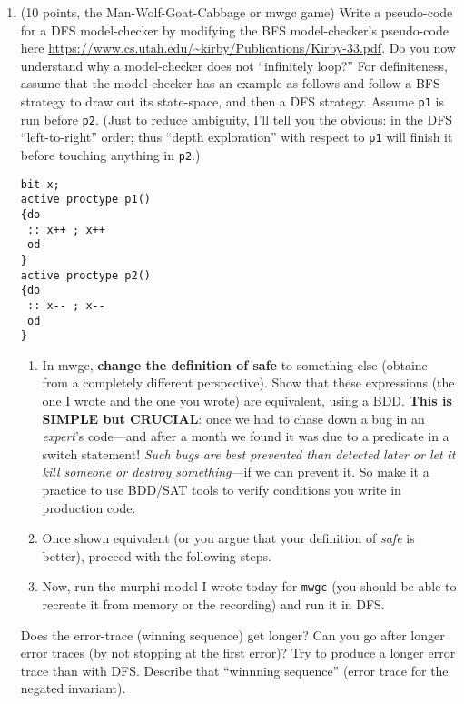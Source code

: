\documentclass[11pt]{article}
\begin{document}
\begin{enumerate}
\clearpage
\item (10 points, the Man-Wolf-Goat-Cabbage or mwgc game)
  Write a pseudo-code for
  a DFS model-checker by modifying the BFS model-checker's
  pseudo-code here
  \url{https://www.cs.utah.edu/~kirby/Publications/Kirby-33.pdf}.
  Do you now understand why a model-checker does not ``infinitely loop?''
  For definiteness, assume that the model-checker has an example as follows
  and follow a BFS strategy to draw out its state-space, and then a DFS
  strategy.
  Assume {\tt p1} is run before {\tt p2}. (Just to
  reduce ambiguity, I'll tell you
  the obvious: in the DFS ``left-to-right'' order;
  thus ``depth exploration'' with respect to {\tt p1} will finish it before
  touching anything in {\tt p2}.)
  \begin{footnotesize}
  \begin{verbatim}    
bit x;
active proctype p1()
{do
 :: x++ ; x++ 
 od
}
active proctype p2()
{do
 :: x-- ; x-- 
 od
}
\end{verbatim}
  \end{footnotesize}    
  \begin{enumerate}
\item In mwgc, {\bf change the definition of safe} to something
  else (obtaine from a completely different perspective).
  Show that these expressions (the one I wrote and the
  one you wrote) are equivalent, using a BDD.
  {\bf This is SIMPLE but CRUCIAL}: once we had to chase down
  a bug in an {\em expert}'s code---and after a month we found
  it was due to a predicate in a switch statement!
  {\em Such bugs are best prevented than detected later or let
    it kill someone or destroy something}---if we can prevent it.
  So make it a practice to use BDD/SAT tools to verify conditions
  you write in production code.
\item[]   Once shown equivalent (or you argue that your definition of {\em safe}
  is better), proceed with the following steps.
  

\item  Now, run the murphi model I wrote today
  for {\tt mwgc}
  (you should be able to recreate it from
  memory or the recording) and run it in DFS.
  \end{enumerate}
  Does the error-trace (winning sequence) get longer?
  Can you go after longer error traces (by not stopping at the first error)?
  Try to produce a longer error trace than with DFS.
  Describe that ``winnning sequence'' (error trace for the negated invariant).


\end{enumerate}
\end{document}
